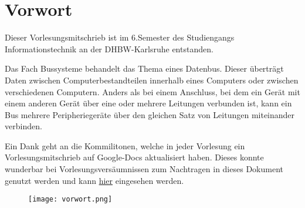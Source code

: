 \chapter*{Vorwort}
Dieser Vorlesungsmitschrieb ist im 6.Semester des Studiengangs Informationstechnik an der DHBW-Karlsruhe entstanden.
\par
Das Fach Bussysteme behandelt das Thema eines Datenbus. Dieser überträgt Daten zwischen Computerbestandteilen innerhalb eines Computers oder zwischen verschiedenen Computern. Anders als bei einem Anschluss, bei dem ein Gerät mit einem anderen Gerät über eine oder mehrere Leitungen verbunden ist, kann ein Bus mehrere Peripheriegeräte über den gleichen Satz von Leitungen miteinander verbinden.
\par
Ein Dank geht an die Kommilitonen, welche in jeder Vorlesung ein Vorlesungsmitschrieb auf Google-Docs aktualisiert haben. Dieses konnte wunderbar bei Vorlesungsversäumnissen zum Nachtragen in dieses Dokument genutzt werden und kann \href{https://www.google.com/url?q=https%3A%2F%2Fdocs.google.com%2Fdocument%2Fd%2F1bVH2fVSst7iG3dhWXjIo6FsLtSjdwrZTV5Z2JXYnOfI%2Fedit%3Fusp%3Dsharing}{hier} eingesehen werden.
\begin{figure}[htbp]
  \centering
  \texttt{[image: vorwort.png]}
\end{figure}